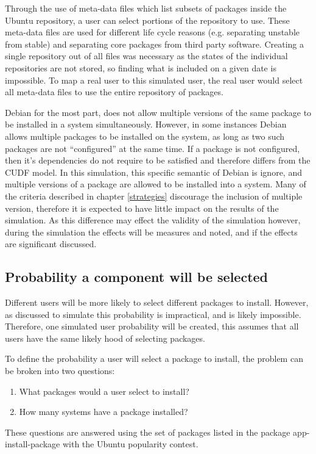 Through the use of meta-data files which list subsets of packages inside the Ubuntu repository, a user can select portions of the repository to use.
These meta-data files are used for different life cycle reasons (e.g. separating unstable from stable) and separating core packages from third party software.
Creating a single repository out of all files was necessary as the states of the individual repositories are not stored,
so finding what is included on a given date is impossible.
To map a real user to this simulated user, the real user would select all meta-data files to use the entire repository of packages. 

Debian for the most part, does not allow multiple versions of the same package to be installed in a system simultaneously.
However, in some instances Debian allows multiple packages to be installed on the system, as long as two such packages are not ``configured'' at the same time.
If a package is not configured, then it's dependencies do not require to be satisfied and therefore differs from the CUDF model.
In this simulation, this specific semantic of Debian is ignore, and multiple versions of a package are allowed to be installed into a system.
Many of the criteria described in chapter \ref{strategies} discourage the inclusion of multiple version,
therefore it is expected to have little impact on the results of the simulation.
As this difference may effect the validity of the simulation however, during the simulation the effects will be measures and noted, and if the effects are significant discussed.


\subsection{Probability a component will be selected}
Different users will be more likely to select different packages to install.
However, as discussed to simulate this probability is impractical, and is likely impossible.
Therefore, one simulated user probability will be created, this assumes that all users have the same likely hood of selecting packages.

To define the probability a user will select a package to install, the problem can be broken into two questions:
\begin{enumerate}
  \item What packages would a user select to install?
  \item How many systems have a package installed?
\end{enumerate}
These questions are answered using the set of packages listed in the package app-install-package with the Ubuntu popularity contest.

